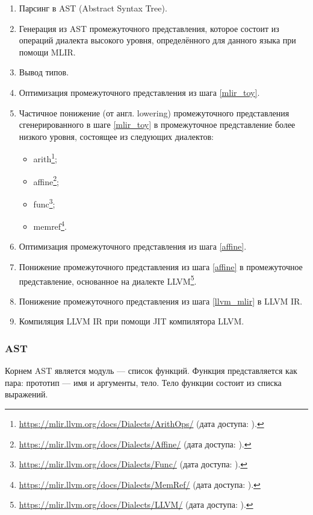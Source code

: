 \begin{enumerate}
	\item Парсинг в AST (Abstract Syntax Tree).
	\item \label{mlir_toy} Генерация из AST промежуточного представления, которое состоит из операций диалекта высокого уровня, определённого для данного языка при помощи MLIR.
	\item Вывод типов.
	\item Оптимизация промежуточного представления из шага \ref{mlir_toy}.
	\item \label{affine} Частичное понижение (от англ. lowering) промежуточного представления сгенерированного в шаге \ref{mlir_toy} в промежуточное представление более низкого уровня, состоящее из следующих диалектов:
	      \begin{itemize}
		      \item arith\footnote{\url{https://mlir.llvm.org/docs/Dialects/ArithOps/} (дата доступа:   ).};
		      \item affine\footnote{\url{https://mlir.llvm.org/docs/Dialects/Affine/} (дата доступа:   ).};
		      \item func\footnote{\url{https://mlir.llvm.org/docs/Dialects/Func/} (дата доступа:   ).};
		      \item memref\footnote{\url{https://mlir.llvm.org/docs/Dialects/MemRef/} (дата доступа:   ).}.
	      \end{itemize}
	\item Оптимизация промежуточного представления из шага \ref{affine}.
	\item \label{llvm_mlir} Понижение промежуточного представления из шага \ref{affine} в промежуточное представление, основанное на диалекте LLVM\footnote{\url{https://mlir.llvm.org/docs/Dialects/LLVM/} (дата доступа:   ).}.
	\item Понижение промежуточного представления из шага \ref{llvm_mlir} в LLVM IR.
	\item Компиляция LLVM IR при помощи JIT компилятора LLVM.
\end{enumerate}

\subsubsection{AST}

Корнем AST является модуль --- список функций. Функция представляется как пара: прототип --- имя и аргументы, тело. Тело функции состоит из списка выражений.


